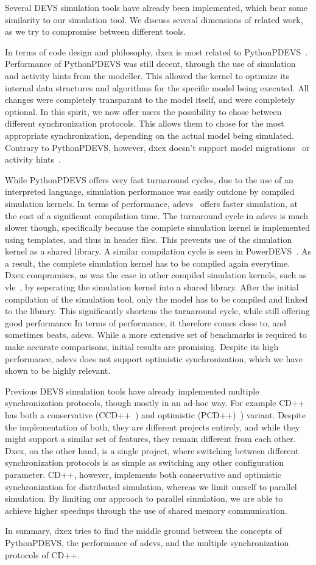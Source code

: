 Several \textsf{DEVS} simulation tools have already been implemented, which bear some similarity to our simulation tool.
We discuss several dimensions of related work, as we try to compromise between different tools.

In terms of code design and philosophy, dxex is most related to PythonPDEVS~\cite{PythonPDEVS}.
Performance of PythonPDEVS was still decent, through the use of simulation and activity hints from the modeller.
This allowed the kernel to optimize its internal data structures and algorithms for the specific model being executed.
All changes were completely transparant to the model itself, and were completely optional.
In this spirit, we now offer users the possibility to chose between different synchronization protocols.
This allows them to chose for the most appropriate synchronization, depending on the actual model being simulated.
Contrary to PythonPDEVS, however, dxex doesn't support model migrations~\cite{PythonPDEVS2} or activity hints~\cite{PythonPDEVS_ACTIMS}.

While PythonPDEVS offers very fast turnaround cycles, due to the use of an interpreted language, simulation performance was easily outdone by compiled simulation kernels.
In terms of performance, adevs~\cite{adevs} offers faster simulation, at the cost of a significant compilation time.
The turnaround cycle in adevs is much slower though, specifically because the complete simulation kernel is implemented using templates, and thus in header files.
This prevents use of the simulation kernel as a shared library.
A similar compilation cycle is seen in PowerDEVS~\cite{PowerDEVS}.
As a result, the complete simulation kernel has to be compiled again everytime.
Dxex compromises, as was the case in other compiled simulation kernels, such as vle~\cite{vle}, by seperating the simulation kernel into a shared library.
After the initial compilation of the simulation tool, only the model has to be compiled and linked to the library.
This significantly shortens the turnaround cycle, while still offering good performance
In terms of performance, it therefore comes close to, and sometimes beats, adevs.
While a more extensive set of benchmarks is required to make accurate comparisons, initial results are promising.
Despite its high performance, adevs does not support optimistic synchronization, which we have shown to be highly relevant.

Previous \textsf{DEVS} simulation tools have already implemented multiple synchronization protocols, though mostly in an ad-hoc way.
For example CD++~\cite{CD++} has both a conservative (CCD++~\cite{CCD++}) and optimistic (PCD++)~\cite{PCD++}) variant.
Despite the implementation of both, they are different projects entirely, and while they might support a similar set of features, they remain different from each other.
Dxex, on the other hand, is a single project, where switching between different synchronization protocols is as simple as switching any other configuration parameter.
CD++, however, implements both conservative and optimistic synchronization for distributed simulation, whereas we limit ourself to parallel simulation.
By limiting our approach to parallel simulation, we are able to achieve higher speedups through the use of shared memory communication.

In summary, dxex tries to find the middle ground between the concepts of PythonPDEVS, the performance of adevs, and the multiple synchronization protocols of CD++.
